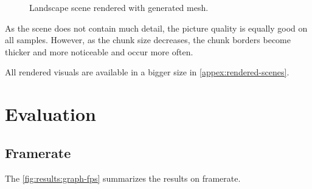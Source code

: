 \begin{figure}[h]
    \caption{Landscape scene rendered with generated mesh.}
\end{figure}

As the scene does not contain much detail, the picture quality is equally good on all samples. However, as the chunk size decreases, the chunk borders become thicker and more noticeable and occur more often.

All rendered visuals are available in a bigger size in \autoref{appex:rendered-scenes}.

\section{Evaluation}

\subsection{Framerate}

The \autoref{fig:results:graph-fps} summarizes the results on framerate.

